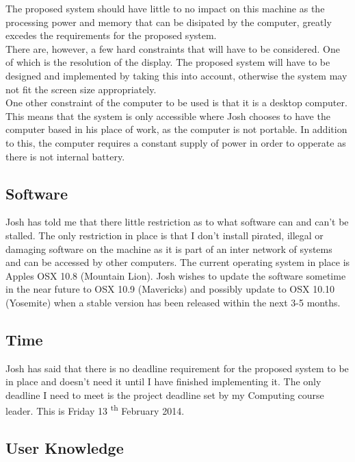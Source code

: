 \noindent The proposed system should have little to no impact on this machine as the processing power and memory that can be disipated by the computer, greatly excedes the requirements for the proposed system.\\

\noindent There are, however, a few hard constraints that will have to be considered. One of which is the resolution of the display. The proposed system will have to be designed and implemented by taking this into account, otherwise the system may not fit the screen size appropriately.\\

\noindent One other constraint of the computer to be used is that it is a desktop computer. This means that the system is only accessible where Josh chooses to have the computer based in his place of work, as the computer is not portable. In addition to this, the computer requires a constant supply of power in order to opperate as there is not internal battery.\\

\subsection{Software}

Josh has told me that there little restriction as to what software can and can't be stalled. The only restriction in place is that I don't install pirated, illegal or damaging software on the machine as it is part of an inter network of systems and can be accessed by other computers. The current operating system in place is Apples OSX 10.8 (Mountain Lion). Josh wishes to update the software sometime in the near future to OSX 10.9 (Mavericks) and possibly update to OSX 10.10 (Yosemite) when a stable version has been released within the next 3-5 months.

\subsection{Time}

Josh has said that there is no deadline requirement for the proposed system to be in place and doesn't need it until I have finished implementing it. The only deadline I need to meet is the project deadline set by my Computing course leader. This is Friday 13 \textsuperscript{th} February 2014.

\subsection{User Knowledge}

